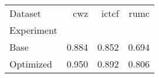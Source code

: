 \begin{tabular}{lrrr}
\toprule
Dataset &   cwz &  ictcf &  rumc \\
Experiment &       &        &       \\
\midrule
Base       & 0.884 &  0.852 & 0.694 \\
Optimized  & 0.950 &  0.892 & 0.806 \\
\bottomrule
\end{tabular}
